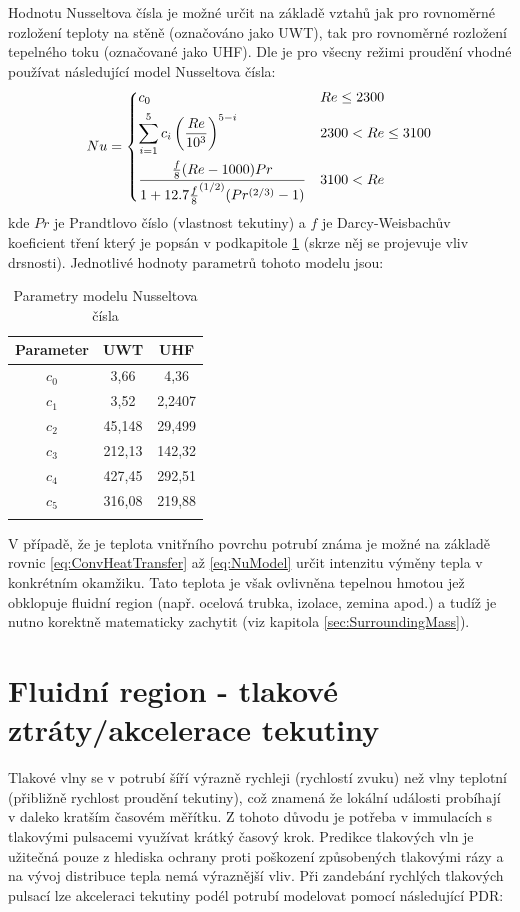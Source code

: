 Hodnotu Nusseltova čísla je možné určit na základě vztahů jak pro rovnoměrné
rozložení teploty na stěně (označováno jako UWT), tak pro rovnoměrné rozložení
tepelného toku (označované jako UHF). Dle \cite{Abraham2009} je pro všecny
režimi proudění vhodné používat následující model Nusseltova čísla:
\begin{equation}
\label{eq:NuModel}
  Nu =
  \begin{dcases}
    c_0 & Re\leq 2300 \\
    \sum_{i=1}^{5} c_i\left(\frac{Re}{10^3}\right)^{5-i} & 2300 < Re\le 3100 \\
    \frac{\frac{f}{8}(Re-1000)Pr}
    {1+12.7{\frac{f}{8}}^{(1/2)}(Pr^{(2/3)}-1)} & 3100 < Re
  \end{dcases}
\end{equation}
kde \(Pr\) je Prandtlovo číslo (vlastnost tekutiny) a \(f\) je Darcy-Weisbachův
koeficient tření který je popsán v podkapitole \ref{sec:PressureLoss} (skrze
něj se projevuje vliv drsnosti). Jednotlivé hodnoty parametrů tohoto modelu
jsou:
\begin{table}[H]
  \label{tab:NuModel}
  \caption{Parametry modelu Nusseltova čísla}
  \vskip6pt
  \centering
  \begin{tabular}{ccc}
    \toprule
    Parameter & UWT & UHF \\ [0.5ex]
    \hline
    \(c_0\) & 3,66 & 4,36 \\
    \(c_1\) & 3,52 & 2,2407 \\
    \(c_2\) & 45,148 & 29,499 \\
    \(c_3\) & 212,13 & 142,32 \\
    \(c_4\) & 427,45 & 292,51 \\
    \(c_5\) & 316,08 & 219,88 \\
    \bottomrule \\[0.1mm]
  \end{tabular}
\end{table}
V případě, že je teplota vnitřního povrchu potrubí známa je možné na základě
rovnic \ref{eq:ConvHeatTransfer} až \ref{eq:NuModel} určit intenzitu výměny
tepla v konkrétním okamžiku. Tato teplota je však ovlivněna tepelnou hmotou jež
obklopuje fluidní region (např. ocelová trubka, izolace, zemina apod.) a tudíž
je nutno korektně matematicky zachytit (viz kapitola \ref{sec:SurroundingMass}).

\section{Fluidní region - tlakové ztráty/akcelerace tekutiny}
\label{sec:PressureLoss}
Tlakové vlny se v potrubí šíří výrazně rychleji (rychlostí zvuku) než vlny
teplotní (přibližně rychlost proudění tekutiny), což znamená že lokální
události probíhají v daleko kratším časovém měřítku. Z tohoto důvodu je potřeba
v immulacích s tlakovými pulsacemi využívat krátký časový krok. Predikce
tlakových vln je užitečná pouze z hlediska ochrany proti poškození způsobených
tlakovými rázy a na vývoj distribuce tepla nemá výraznější vliv.
Při zandebání rychlých tlakových pulsací lze akceleraci tekutiny podél potrubí
modelovat pomocí následující PDR:

